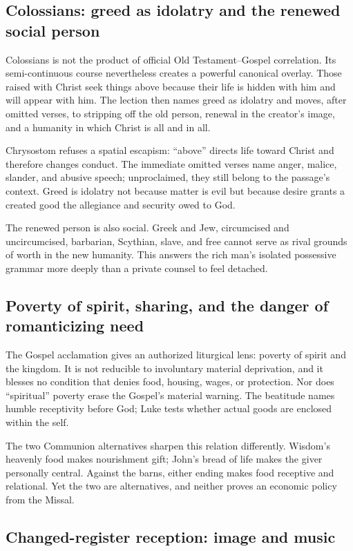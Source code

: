 \subsection*{Colossians: greed as idolatry and the renewed social person}

Colossians is not the product of official Old Testament--Gospel correlation.
Its semi-continuous course nevertheless creates a powerful canonical overlay.
Those raised with Christ seek things above because their life is hidden with
him and will appear with him. The lection then names greed as idolatry and
moves, after omitted verses, to stripping off the old person, renewal in the
creator's image, and a humanity in which Christ is all and in all.

Chrysostom refuses a spatial escapism: “above” directs life toward Christ and
therefore changes conduct. The immediate omitted verses name anger, malice,
slander, and abusive speech; unproclaimed, they still
belong to the passage's context. Greed is idolatry not because matter is evil but
because desire grants a created good the allegiance and security owed to God.

The renewed person is also social. Greek and Jew, circumcised and
uncircumcised, barbarian, Scythian, slave, and free cannot serve as rival
grounds of worth in the new humanity. This answers the rich man's isolated
possessive grammar more deeply than a private counsel to feel detached.

\subsection*{Poverty of spirit, sharing, and the danger of romanticizing need}

The Gospel acclamation gives an authorized liturgical lens: poverty of spirit
and the kingdom. It is not reducible to involuntary material deprivation, and it blesses no condition that
denies food, housing, wages, or protection. Nor does “spiritual” poverty erase
the Gospel's material warning. The beatitude names humble receptivity before God; Luke tests whether
actual goods are enclosed within the self.

The two Communion alternatives sharpen this relation differently. Wisdom's
heavenly food makes nourishment gift; John's bread of life makes the giver
personally central. Against the barns, either ending makes food receptive and
relational. Yet the two are alternatives, and neither proves an
economic policy from the Missal.

\subsection*{Changed-register reception: image and music}

